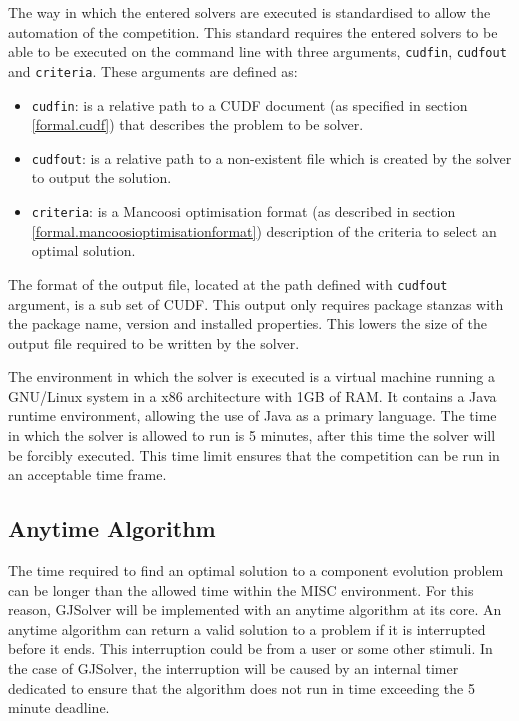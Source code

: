 The way in which the entered solvers are executed is standardised to allow the automation of the competition.
This standard requires the entered solvers to be able to be executed on the command line with three arguments, \verb+cudfin+, \verb+cudfout+ and \verb+criteria+.
These arguments are defined as:
\begin{itemize}
  \item \verb+cudfin+: is a relative path to a CUDF document (as specified in section \ref{formal.cudf}) that describes the problem to be solver.
  \item \verb+cudfout+: is a relative path to a non-existent file which is created by the solver to output the solution.
  \item \verb+criteria+: is a Mancoosi optimisation format (as described in section \ref{formal.mancoosioptimisationformat}) description of the criteria to select an optimal solution. 
\end{itemize}
The format of the output file, located at the path defined with \verb+cudfout+ argument, is a sub set of CUDF.
This output only requires package stanzas with the package name, version and installed properties.
This lowers the size of the output file required to be written by the solver.

The environment in which the solver is executed is a virtual machine running a GNU/Linux system in a x86 architecture with 1GB of RAM.
It contains a Java runtime environment, allowing the use of Java as a primary language.
The time in which the solver is allowed to run is 5 minutes, after this time the solver will be forcibly executed.
This time limit ensures that the competition can be run in an acceptable time frame.

\subsection{Anytime Algorithm}
The time required to find an optimal solution to a component evolution problem can be longer than the allowed time within the MISC environment.
For this reason, GJSolver will be implemented with an anytime algorithm at its core.
An anytime algorithm can return a valid solution to a problem if it is interrupted before it ends.
This interruption could be from a user or some other stimuli.
In the case of GJSolver, the interruption will be caused by an internal timer dedicated to ensure that the algorithm does not run in time exceeding the 5 minute deadline.

